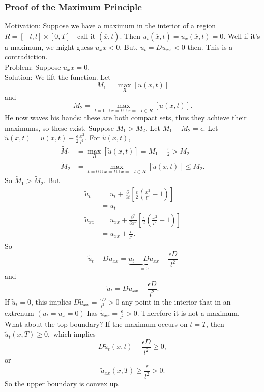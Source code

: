 \documentclass[cm]{article}
\newcommand{\xbar}{\overline{x}}
\newcommand{\tbar}{\overline{t}}
\newcommand{\utilde}{\tilde{u}}
\newcommand{\Mtilde}{\tilde{M}}
\begin{document}
\subsubsection{Proof of the Maximum Principle}
Motivation: Suppose we have a maximum in the interior of a region $R = [-l,l]\times[0,T]$ - call it $(\xbar,\tbar)$. Then $u_t(\xbar,\tbar) = u_x(\xbar,t) = 0$. Well if it's a maximum, we might guess $u_xx < 0$. But, $u_t = Du_{xx} < 0$ then. This is a contradiction.\\
Problem: Suppose $u_xx = 0.$\\
Solution: We lift the function. Let $$M_1 = \max_R [u(x,t)]$$ and $$M_2 = \max_{t = 0 \cup x = l \cup x = -l \in R}[u(x,t)].$$ He now waves his hands: these are both compact sets, thus they achieve their maximums, so these exist. Suppose $M_1 > M_2$. Let $M_1 - M_2 = \epsilon$. Let $\utilde(x,t) = u(x,t) + \frac{\epsilon}{2} \frac{x^2}{l^2}$.
For $\utilde(x,t)$,
\begin{align*}
\Mtilde_1 &= \max_R[\utilde(x,t)] = M_1 - \frac{\epsilon}{2} > M_2 \\
\Mtilde_2 &= \max_{t = 0 \cup x = l \cup x = -l \in R}[\utilde(x,t)] \leq M_2.
\end{align*}
So $\Mtilde_1 > \Mtilde_2$. But
\begin{align*}
\utilde_t &= u_t + \frac{\partial}{\partial t} [\frac{\epsilon}{2} (\frac{x^2}{l^2} - 1)] \\
&= u_t \\
\utilde_{xx} &= u_{xx} + \frac{\partial^2}{\partial x^2} [\frac{\epsilon}{2}(\frac{x^2}{l^2} - 1)] \\
&= u_{xx} + \frac{\epsilon}{l^2}.
\end{align*}
So
$$\utilde_t - D \utilde_{xx} = \underbrace{u_t - Du_{xx}}_{=0} - \frac{\epsilon D}{l^2}$$
and
$$\utilde_t = D\utilde_{xx} - \frac{\epsilon D}{l^2}.$$
If $\utilde_t = 0$, this implies $D\utilde_{xx} = \frac{\epsilon D}{l^2} > 0$
any point in the interior that in an extrenum $(u_t = u_x = 0)$ has $\utilde_{xx} = \frac{\epsilon}{l^2} > 0$. Therefore it is not a maximum.\\
What about the top boundary? If the maximum occurs on $t = T$, then $\utilde_t(x,T) \geq 0,$
which implies
$$D\utilde_t(x,t) - \frac{\epsilon D}{l^2} \geq 0,$$
or
$$\utilde_{xx}(x,T) \geq \frac{\epsilon}{l^2} > 0.$$
So the upper boundary is convex up. \smiley
\end{document}
